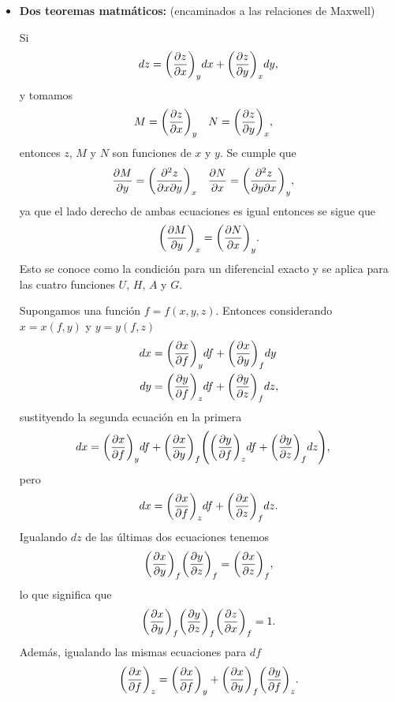 \begin{itemize}
\item \textbf{Dos teoremas matmáticos:} (encaminados a 
las relaciones de Maxwell)
\begin{teorema}[\label{teo:1}]
Si 
\begin{align*}
dz=\qty(\pdv{z}{x})_ydx+\qty(\pdv{z}{y})_xdy,
\end{align*}
y tomamos 
\begin{align*}
M&=\qty(\pdv{z}{x})_y & N&=\qty(\pdv{z}{y})_x,
\end{align*}
entonces $z$, $M$ y $N$ son funciones de $x$ y $y$. Se cumple que
\begin{align*}
\pdv{M}{y}&=\qty(\pdv{z}{x}{y})_x & 
\pdv{N}{x}&=\qty(\pdv{z}{y}{x})_y,
\end{align*}
ya que el lado derecho de ambas ecuaciones es igual entonces se 
sigue que 
\begin{align}
\qty(\pdv{M}{y})_x=\qty(\pdv{N}{x})_y.
\end{align}
Esto se conoce como la condición para un diferencial exacto y 
se aplica para las cuatro funciones $U$, $H$, $A$ y $G$.
\end{teorema}
\begin{teorema}
Supongamos una función $f=f(x,y,z)$. Entonces considerando
$x=x(f,y)$ y $y=y(f,z)$
\begin{align*}
dx&=\qty(\pdv{x}{f})_ydf+\qty(\pdv{x}{y})_fdy\\
dy&=\qty(\pdv{y}{f})_zdf+\qty(\pdv{y}{z})_fdz,
\end{align*}
sustityendo la segunda ecuación en la primera
\begin{align*}
dx&=\qty(\pdv{x}{f})_ydf+\qty(\pdv{x}{y})_f
\qty(\qty(\pdv{y}{f})_zdf+\qty(\pdv{y}{z})_fdz),
\end{align*}
pero 
\begin{align*}
dx=\qty(\pdv{x}{f})_zdf+\qty(\pdv{x}{z})_fdz.
\end{align*}
Igualando $dz$ de las últimas dos ecuaciones tenemos 
\begin{align}
\qty(\pdv{x}{y})_f\qty(\pdv{y}{z})_f=\qty(\pdv{x}{z})_f,
\end{align}
lo que significa que 
\begin{align}
\qty(\pdv{x}{y})_f\qty(\pdv{y}{z})_f\qty(\pdv{z}{x})_f=1.
\end{align}
Además, igualando las mismas ecuaciones para $df$
\begin{align}
\qty(\pdv{x}{f})_z=
\qty(\pdv{x}{f})_y+\qty(\pdv{x}{y})_f\qty(\pdv{y}{f})_z.
\end{align}
\end{teorema}
\end{itemize}
